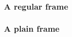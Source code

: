 \documentclass{beamer}
\begin{document}
\begin{frame}
  \frametitle{A regular frame}
\end{frame}

\begin{frame}
  \frametitle{A plain frame}
\end{frame}
\end{document}

